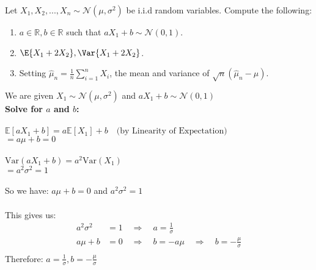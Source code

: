 \documentclass{article}
\begin{document}
\begin{aprob}
    Let $X_1, X_2, ..., X_n \sim \mathcal{N}(\mu, \sigma^2)$ be i.i.d random variables. Compute the following:
    \begin{enumerate}
        \item {} $a\in{\mathbb R},b\in{\mathbb R}$ such that $aX_1+b \sim \mathcal{N}(0,1)$.
        \item {} $\E{X_1 + 2X_2}, \Var{X_1 + 2X_2}$.
        \item {} Setting $\widehat{\mu}_n = \frac{1}{n} \sum_{i=1}^n X_i$, the mean and variance of $\sqrt{n}(\widehat{\mu}_n - \mu)$.
    \end{enumerate}
    \begin{tcolorbox}[colback=lightgray!10!white, colframe=black, title=A4.a]
    We are given $X_1 \sim \mathcal{N}(\mu, \sigma^2)$  and $aX_1 + b \sim \mathcal{N}(0,1)$ \\
    \textbf{Solve for $a$ and $b$:} \\
    \vspace{0.5em} \\
    $\mathbb{E}[aX_1 + b] = a\mathbb{E}[X_1] + b \quad \text{(by Linearity of Expectation)}$ \\
    $= a\mu + b = 0$ \\
    \vspace{0.5em} \\
    $\text{Var}(aX_1 + b) = a^2\text{Var}(X_1)$ \\
    $= a^2\sigma^2 = 1$ \\
    \vspace{0.5em} \\
    So we have: $a\mu + b = 0$ and $a^2\sigma^2 = 1$ \\
    \vspace{0.5em} \\
    This gives us: \\
    \[
    \begin{aligned}
    a^2\sigma^2 &= 1 \quad\Rightarrow\quad a = \frac{1}{\sigma} \\
    a\mu + b &= 0  \quad\Rightarrow\quad b = -a\mu \quad\Rightarrow\quad b = -\frac{\mu}{\sigma} \\
    \end{aligned}
    \]
    Therefore: $a = \frac{1}{\sigma}, b = -\frac{\mu}{\sigma}$
    \vspace{0.3cm}
    \end{tcolorbox}
    \begin{tcolorbox}[colback=lightgray!10!white, colframe=black, title=A4.b]

\end{tcolorbox}
\end{aprob}
\end{document}
